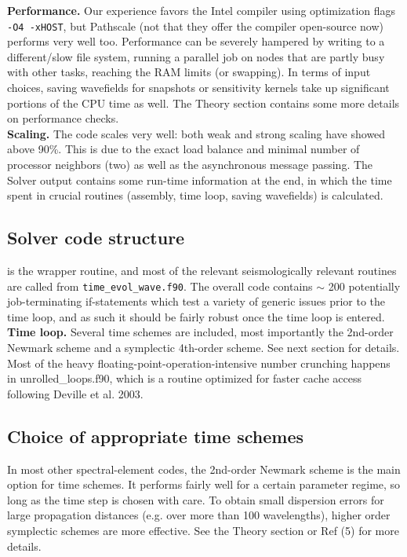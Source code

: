 \documentclass[11pt,letter,fleqn,english,notitlepage]{article}
\begin{document}
\noindent \textbf{Performance.} Our experience favors the Intel compiler using optimization flags {\tt -O4 -xHOST}, but 
Pathscale (not that they offer the compiler open-source now) performs very well too.
Performance can be severely hampered by writing to a different/slow file system, running a parallel job on nodes that 
are partly busy with other tasks, reaching the RAM limits (or swapping). In terms of input choices, saving wavefields 
for snapshots or sensitivity kernels take up significant portions of the CPU time as well. The Theory section contains 
some more details on performance checks.\\

\noindent \textbf{Scaling.} The code scales very well: both weak and strong scaling have showed above 90\%. 
This is due to the exact load balance and minimal number of processor neighbors (two) as well as the asynchronous 
message passing. The Solver output contains some run-time information at the end, in which the time spent in 
crucial routines (assembly, time loop, saving wavefields) is calculated. 

\subsection{Solver code structure}
 is  the wrapper routine, and most of the relevant seismologically relevant 
routines are called from {\tt time\_evol\_wave.f90}. The overall code contains $\sim$ 200 potentially 
job-terminating if-statements which test a variety of generic issues prior 
to the time loop, and as such it should be fairly robust once the time loop is entered. \\

\noindent \textbf{Time loop.} 
Several time schemes are included, most importantly the 2nd-order Newmark scheme and a symplectic 4th-order 
scheme. See next section for details.
Most of the heavy floating-point-operation-intensive number crunching happens in unrolled\_loops.f90, which 
is a routine optimized for faster cache access following Deville et al. 2003. 

\subsection{Choice of appropriate time schemes}
In most other spectral-element codes, the 2nd-order Newmark scheme is 
the main option for time schemes. It performs fairly well for a certain parameter regime, so long 
as the time step is chosen with care. To obtain small dispersion errors for large 
propagation distances (e.g. over more than 100 wavelengths), higher order symplectic 
schemes are more effective. See the Theory section or Ref (5) for more details.\\
\end{document}
